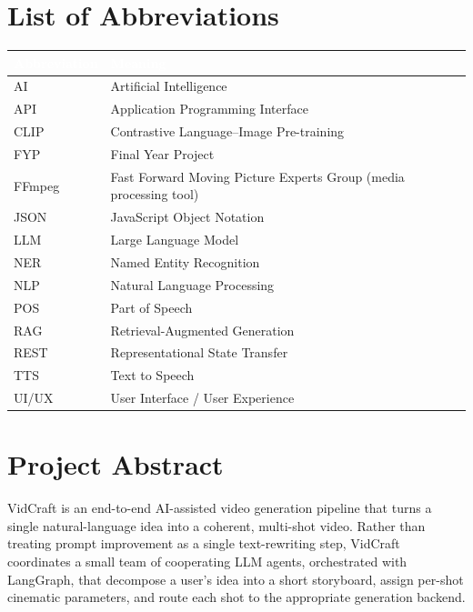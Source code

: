 \documentclass[11pt,a4paper]{article}
\newcommand{\tblhead}[1]{\cellcolor{headerblue}\textcolor{white}{\textbf{#1}}}
\begin{document}
\section*{List of Abbreviations}
\begin{center}
\begin{tabular}{|l|l|}
\hline
\tblhead{Abbreviation} & \tblhead{Meaning} \\
\hline
AI & Artificial Intelligence \\
API & Application Programming Interface \\
CLIP & Contrastive Language--Image Pre-training \\
FYP & Final Year Project \\
FFmpeg & Fast Forward Moving Picture Experts Group (media processing tool) \\
JSON & JavaScript Object Notation \\
LLM & Large Language Model \\
NER & Named Entity Recognition \\
NLP & Natural Language Processing \\
POS & Part of Speech \\
RAG & Retrieval-Augmented Generation \\
REST & Representational State Transfer \\
TTS & Text to Speech \\
UI/UX & User Interface / User Experience \\
\hline
\end{tabular}
\end{center}

\needspace{0.5\textheight}


\section{Project Abstract}

VidCraft is an end-to-end AI-assisted video generation pipeline that turns a single natural-language idea into a coherent, multi-shot video. Rather than treating prompt improvement as a single text-rewriting step, VidCraft coordinates a small team of cooperating LLM agents, orchestrated with LangGraph, that decompose a user's idea into a short storyboard, assign per-shot cinematic parameters, and route each shot to the appropriate generation backend.
\end{document}
